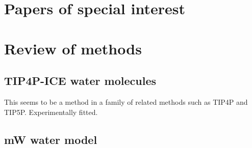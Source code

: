 \documentclass[a4paper]{article}
\begin{document}
\section{Papers of special interest}

\section{Review of methods}

\subsection{TIP4P-ICE water molecules}
This seems to be a method in a family of related methods such as TIP4P and TIP5P. Experimentally fitted.

\subsection{mW water model}


\end{document}
